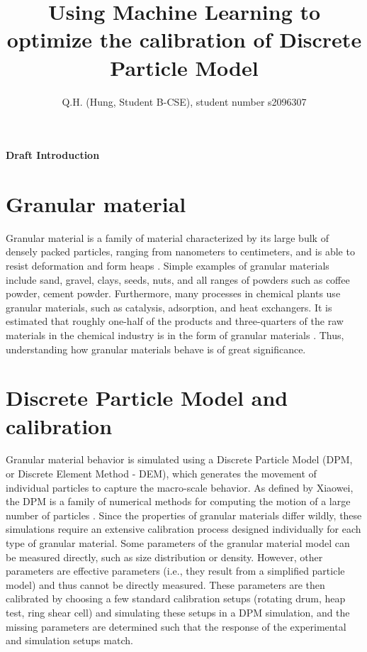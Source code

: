 \documentclass{article}
\title{Using Machine Learning to optimize the calibration of Discrete Particle Model}
\author{Q.H. (Hung, Student B-CSE), student number s2096307}
\begin{document}
\maketitle
\begin {center}
\textbf{\LARGE Draft Introduction}
\end{center}

\section{Granular material}

 Granular material is a family of material characterized by its large bulk of densely packed particles, ranging from nanometers to centimeters, and is able to resist deformation and form heaps \cite{introGranular2, introGranular3}. Simple examples of granular materials include sand, gravel, clays, seeds, nuts, and all ranges of powders such as coffee powder, cement powder. Furthermore, many processes in chemical plants use granular materials, such as catalysis, adsorption, and heat exchangers. It is estimated that roughly one-half of the products and three-quarters of the raw materials in the chemical industry is in the form of granular materials \cite{introGranular}. Thus, understanding how granular materials behave is of great significance.

\section{Discrete Particle Model and calibration}

Granular material behavior is simulated using a Discrete Particle Model (DPM, or Discrete Element Method - DEM), which generates the movement of individual particles to capture the macro-scale behavior. As defined by Xiaowei, the DPM is a family of numerical methods for computing the motion of a large number of particles \cite{Weng:2015}. Since the properties of granular materials differ wildly, these simulations require an extensive calibration process designed individually for each type of granular material. Some parameters of the granular material model can be measured directly, such as size distribution or density. However, other parameters are effective parameters (i.e., they result from a simplified particle model) and thus cannot be directly measured. These parameters are then calibrated by choosing a few standard calibration setups (rotating drum, heap test, ring shear cell) and simulating these setups in a DPM simulation, and the missing parameters are determined such that the response of the experimental and simulation setups match. 
\end{document}
